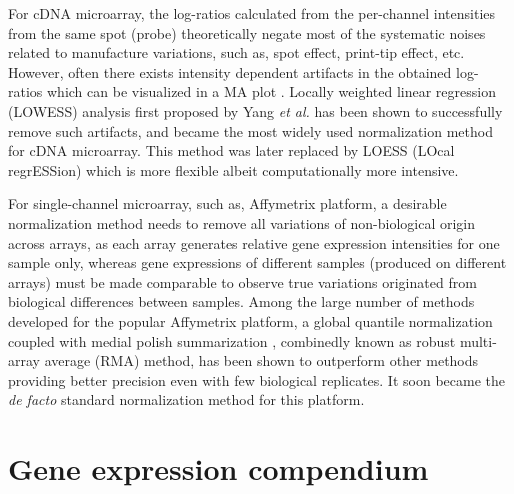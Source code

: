 For cDNA microarray, the log-ratios calculated from the per-channel intensities
from the same spot (probe) theoretically negate most of the systematic noises
related to manufacture variations, such as, spot effect, print-tip effect, etc.
%
However, often there exists intensity dependent artifacts in the obtained
log-ratios which can be visualized in a MA plot \cite{Yang2002}.
%
Locally weighted linear regression (LOWESS) analysis \cite{Cleveland1979} first
proposed by Yang \textit{et al.} \cite{Yang2002} has been shown to successfully
remove such artifacts, and became the most widely used normalization method for
cDNA microarray.
%
This method was later replaced by LOESS (LOcal regrESSion) which is more
flexible albeit computationally more intensive.
%

For single-channel microarray, such as, Affymetrix platform, a desirable
normalization method needs to remove all variations of non-biological origin
across arrays, as each array generates relative gene expression intensities for
one sample only, whereas gene expressions of different samples (produced on
different arrays) must be made comparable to observe true variations originated
from biological differences between samples.
%
Among the large number of methods developed for the popular Affymetrix
platform, a global quantile normalization \cite{Bolstad2003,Irizarry2003a}
coupled with medial polish summarization \cite{Irizarry2003}, combinedly known
as robust multi-array average (RMA) method, has been shown to outperform other
methods \cite{Irizarry2006} providing better precision even with few biological
replicates.  It soon became the \textit{de facto} standard normalization
method for this platform.
%








\section{Gene expression compendium}
%


%


